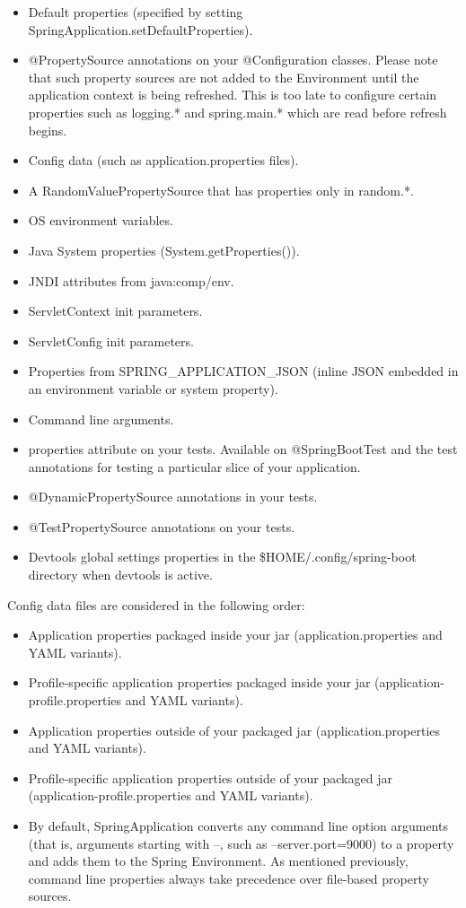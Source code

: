 \documentclass{scrartcl}
\begin{document}
\begin{itemize}
    \item Default properties (specified by setting SpringApplication.setDefaultProperties).
    \item @PropertySource annotations on your @Configuration classes. Please note that such property sources are not added to the Environment until the application context is being refreshed. This is too late to configure certain properties such as logging.* and spring.main.* which are read before refresh begins.
    \item Config data (such as application.properties files).
    \item A RandomValuePropertySource that has properties only in random.*.
    \item OS environment variables.
    \item Java System properties (System.getProperties()).
    \item JNDI attributes from java:comp/env.
    \item ServletContext init parameters.
    \item ServletConfig init parameters.
    \item Properties from SPRING\_APPLICATION\_JSON (inline JSON embedded in an environment variable or system property).
    \item Command line arguments.
    \item properties attribute on your tests. Available on @SpringBootTest and the test annotations for testing a particular slice of your application.
    \item @DynamicPropertySource annotations in your tests.
    \item @TestPropertySource annotations on your tests.
    \item Devtools global settings properties in the \$HOME/.config/spring-boot directory when devtools is active.
\end{itemize}

Config data files are considered in the following order:

\begin{itemize}
    \item Application properties packaged inside your jar (application.properties and YAML variants).
    \item Profile-specific application properties packaged inside your jar (application-{profile}.properties and YAML variants).
    \item Application properties outside of your packaged jar (application.properties and YAML variants).
    \item Profile-specific application properties outside of your packaged jar (application-{profile}.properties and YAML variants).
    \item By default, SpringApplication converts any command line option arguments (that is, arguments starting with --, such as --server.port=9000) to a property and adds them to the Spring Environment. As mentioned previously, command line properties always take precedence over file-based property sources.
\end{itemize}
\end{document}
